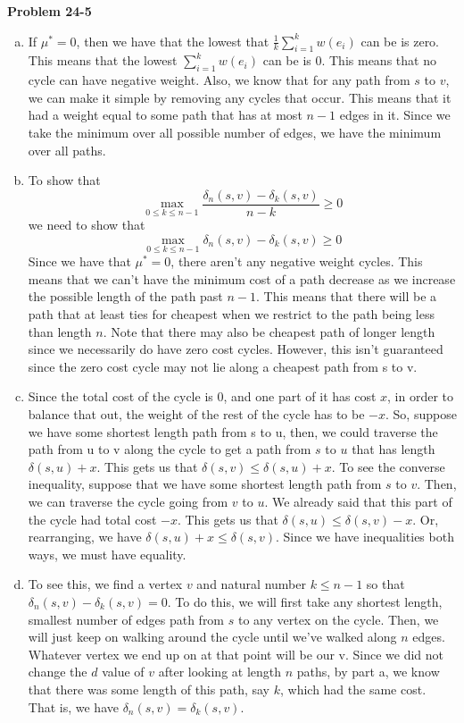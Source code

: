 \documentclass{article}
\begin{document}
\noindent\textbf{Problem 24-5}\\

\begin{enumerate}[a.]
\item
If $\mu^* =0$, then we have that the lowest that $\frac{1}{k}\sum_{i=1}^k w(e_i)$ can be is zero. This means that the lowest $\sum_{i=1}^k w(e_i)$ can be is 0. This means that no cycle can have negative weight. Also, we know that for any path from $s$ to $v$, we can make it simple by removing any cycles that occur. This means that it had a weight equal to some path that has at most $n-1$ edges in it. Since we take the minimum over all possible number of edges, we have the minimum over all paths.
\item
To show that 
\[
\max_{0\le k\le n-1} \frac{\delta_n(s,v) - \delta_k(s,v)}{n-k} \ge 0
\]
we need to show that
\[
\max_{0\le k\le n-1} \delta_n(s,v) - \delta_k(s,v) \ge 0
\]
Since we have that $\mu^*=0$, there aren't any negative weight cycles. This means that we can't have the minimum cost of a path decrease as we increase the possible length of the path past $n-1$. This means that there will be a path that at least ties for cheapest when we restrict to the path being less than length $n$. Note that there may also be cheapest path of longer length since we necessarily do have zero cost cycles. However, this isn't guaranteed since the zero cost cycle may not lie along a cheapest path from s to v.

\item
Since the total cost of the cycle is 0, and one part of it has cost $x$, in order to balance that out, the weight of the rest of the cycle has to be $-x$. So, suppose we have some shortest length path from s to u, then, we could traverse the path from u to v along the cycle to get a path from $s$ to $u$ that has length $\delta(s,u)+x$. This gets us that $\delta(s,v) \le \delta(s,u)+x$. To see the converse inequality, suppose that we have some shortest length path from $s$ to $v$. Then, we can traverse the cycle going from $v$ to $u$. We already said that this part of the cycle had total cost $-x$. This gets us that $\delta(s,u) \le \delta(s,v)-x$. Or, rearranging, we have $\delta(s,u)+x \le \delta(s,v)$. Since we have inequalities both ways, we must have equality.

\item
To see this, we find a vertex $v$ and natural number $k\le n-1$ so that $\delta_n(s,v) - \delta_k(s,v) =0$. To do this, we will first take any shortest length, smallest number of edges path from $s$ to any vertex on the cycle. Then, we will just keep on walking around the cycle until we've walked along $n$ edges. Whatever vertex we end up on at that point will be our v. Since we did not change the $d$ value of $v$ after looking at length $n$ paths, by part a, we know that there was some length of this path, say $k$, which had the same cost. That is, we have $\delta_n(s,v) = \delta_k(s,v)$.


\end{enumerate}
\end{document}
